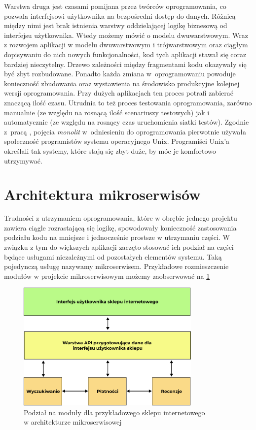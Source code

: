 \documentclass{SGGW-thesis}
\begin{document}
Warstwa druga jest czasami pomijana przez twórców oprogramowania, co pozwala interfejsowi użytkownika na bezpośredni dostęp do danych. Różnicą między nimi jest brak istnienia warstwy oddzielającej logikę biznesową od interfejsu użytkownika. Wtedy możemy mówić o modelu dwuwarstwowym.
Wraz z rozwojem aplikacji w modelu dwuwarstwowym i trójwarstwowym oraz ciągłym dopisywaniu do nich nowych funkcjonalności, kod tych aplikacji stawał się coraz bardziej nieczytelny. Drzewo zależności między fragmentami kodu okazywały się być zbyt rozbudowane.
Ponadto każda zmiana w~oprogramowaniu powoduje konieczność zbudowania oraz wystawienia na środowisko produkcyjne kolejnej wersji oprogramowania. Przy dużych aplikacjach ten proces potrafi zabierać znaczącą ilość czasu. Utrudnia to też proces testowania oprogramowania, zarówno manualnie (ze względu na rosnącą ilość scenariuszy testowych) jak i automatycznie (ze względu na rosnący czas uruchomienia siatki testów).
Zgodnie z~pracą \cite{fowler}, pojęcia \textit{monolit} w~odniesieniu do oprogramowania pierwotnie używała społeczność programistów systemu operacyjnego Unix. Programiści Unix'a określali tak systemy, które stają się zbyt duże, by móc je komfortowo utrzymywać.

\section{Architektura mikroserwisów}

Trudności z utrzymaniem oprogramowania, które w obrębie jednego projektu zawiera ciągle rozrastającą się logikę, spowodowały konieczność zastosowania podziału kodu na mniejsze i jednocześnie prostsze w utrzymaniu części.
W związku z tym do większych aplikacji zaczęto stosować ich podział na części będące usługami niezależnymi od pozostałych elementów systemu. Taką pojedynczą usługę nazywamy mikroserwisem. Przykładowe rozmieszczenie modułów w projekcie mikroserwisowym możemy zaobserwować na \cref{fig:microservices_diagram}

\vfill
\clearpage

\begin{figure}[h]
	\centering
	\captionsetup{justification=centering}
	\includegraphics[width=0.8\textwidth]{microservices_diagram.png}
	\caption{Podział na moduły dla przykładowego sklepu internetowego \\ w architekturze mikroserwisowej}
	\label{fig:microservices_diagram}
\end{figure}
\end{document}

